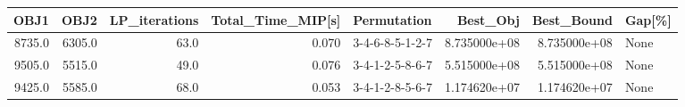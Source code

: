 \begin{tabular}{rrrrlrrl}
\toprule
   OBJ1 &    OBJ2 &  LP\_iterations &  Total\_Time\_MIP[s] &      Permutation &      Best\_Obj &    Best\_Bound & Gap[\%] \\
\midrule
 8735.0 &  6305.0 &           63.0 &              0.070 &  3-4-6-8-5-1-2-7 &  8.735000e+08 &  8.735000e+08 &   None \\
 9505.0 &  5515.0 &           49.0 &              0.076 &  3-4-1-2-5-8-6-7 &  5.515000e+08 &  5.515000e+08 &   None \\
 9425.0 &  5585.0 &           68.0 &              0.053 &  3-4-1-2-8-5-6-7 &  1.174620e+07 &  1.174620e+07 &   None \\
\bottomrule
\end{tabular}
